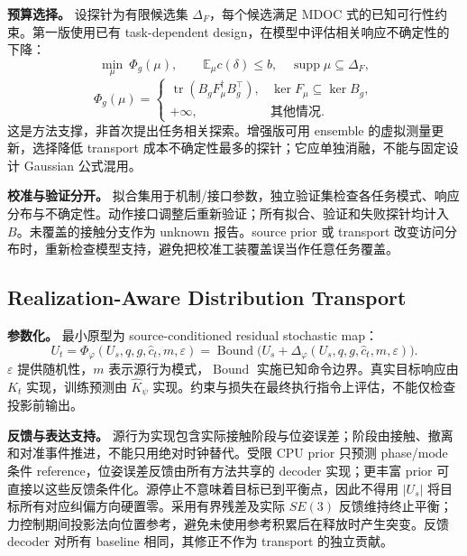 \documentclass[11pt]{article}
\newcommand{\E}{\mathbb E}
\newcommand{\tr}{\operatorname{tr}}
\begin{document}
\textbf{预算选择。} 设探针为有限候选集 $\Delta_F$，每个候选满足 MDOC 式的已知可行性约束。第一版使用已有 task-dependent design，在模型中评估相关响应不确定性的下降：
\begin{equation}
 \min_{\mu}\ \Phi_g(\mu),\qquad
 \E_\mu c(\delta)\le b,\quad\operatorname{supp}\mu\subseteq\Delta_F,
\end{equation}
\begin{equation}
 \Phi_g(\mu)=
 \begin{cases}
 \tr(B_gF_\mu^\dagger B_g^\top),&\ker F_\mu\subseteq\ker B_g,\\
 +\infty,&\text{其他情况}.
 \end{cases}
 \label{eq:probe}
\end{equation}
这是方法支撑，非首次提出任务相关探索。增强版可用 ensemble 的虚拟测量更新，选择降低 transport 成本不确定性最多的探针；它应单独消融，不能与固定设计 Gaussian 公式混用。

\textbf{校准与验证分开。} 拟合集用于机制/接口参数，独立验证集检查各任务模式、响应分布与不确定性。动作接口调整后重新验证；所有拟合、验证和失败探针均计入 $B$。未覆盖的接触分支作为 unknown 报告。source prior 或 transport 改变访问分布时，重新检查模型支持，避免把校准工装覆盖误当作任意任务覆盖。

\subsection{Realization-Aware Distribution Transport}
\label{sec:transport}
\textbf{参数化。} 最小原型为 source-conditioned residual stochastic map：
\begin{equation}
 U_t=\Phi_\varphi(U_s,q,g,\hat c_t,m,\varepsilon)
 =\operatorname{Bound}\big(U_s+\Delta_\varphi(U_s,q,g,\hat c_t,m,\varepsilon)\big).
 \label{eq:residual}
\end{equation}
$\varepsilon$ 提供随机性，$m$ 表示源行为模式，$\operatorname{Bound}$ 实施已知命令边界。真实目标响应由 $K_t$ 实现，训练预测由 $\widehat K_\psi$ 实现。约束与损失在最终执行指令上评估，不能仅检查投影前输出。

\textbf{反馈与表达支持。} 源行为实现包含实际接触阶段与位姿误差；阶段由接触、撤离和对准事件推进，不能只用绝对时钟替代。受限 CPU prior 只预测 phase/mode 条件 reference，位姿误差反馈由所有方法共享的 decoder 实现；更丰富 prior 可直接以这些反馈条件化。源停止不意味着目标已到平衡点，因此不得用 $|U_s|$ 将目标所有对应纠偏方向硬置零。采用有界残差及实际 $SE(3)$ 反馈维持终止平衡；力控制期间投影法向位置参考，避免未使用参考积累后在释放时产生突变。反馈 decoder 对所有 baseline 相同，其修正不作为 transport 的独立贡献。
\end{document}
